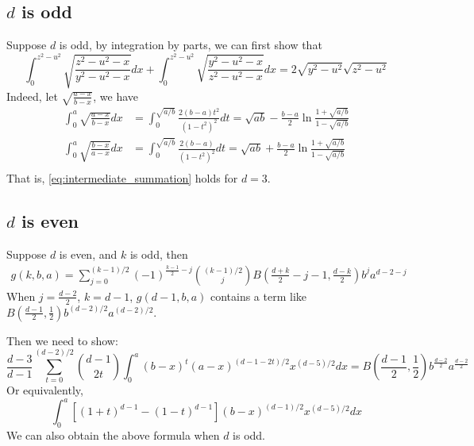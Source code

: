 \documentclass{article}
\begin{document}
\subsection{$d$ is odd}
Suppose $d$ is odd, by integration by parts, we can first show that
\begin{equation}
    \int_0^{z^2-u^2} \sqrt{\frac{z^2-u^2-x}{y^2-u^2-x}}dx
    + \int_0^{z^2-u^2} \sqrt{\frac{y^2-u^2-x}{z^2-u^2-x}}dx
    = 2\sqrt{y^2-u^2}\sqrt{z^2-u^2}
\end{equation}
Indeed, let $\sqrt{\frac{a-x}{b-x}}$, we have
\begin{align}
    \int_0^a \sqrt{\frac{a-x}{b-x}}dx
    &= \int_0^{\sqrt{a/b}} \frac{2(b-a)t^2}{(1-t^2)^2}dt
    =\sqrt{ab} - \frac{b-a}{2}\ln \frac{1+\sqrt{a/b}}{1-\sqrt{a/b}} \\
    \int_0^a \sqrt{\frac{b-x}{a-x}}dx
    &= \int_0^{\sqrt{a/b}} \frac{2(b-a)}{(1-t^2)^2}dt
    =\sqrt{ab} + \frac{b-a}{2}\ln \frac{1+\sqrt{a/b}}{1-\sqrt{a/b}} \\
\end{align}
That is, \eqref{eq:intermediate_summation} holds for $d=3$.

\subsection{$d$ is even}
Suppose $d$ is even, and $k$ is odd, then
\begin{align*}
    g(k,b,a)= \sum_{j=0}^{(k-1)/2}
    (-1)^{\frac{k-1}{2}-j}\binom{(k-1)/2}{j}
    B(\frac{d+k}{2}-j-1, \frac{d-k}{2})
    b^j a^{d-2-j}
\end{align*}
When $j=\frac{d-2}{2}$, $k=d-1$,
$g(d-1,b,a)$
contains a term like
$B(\frac{d-1}{2}, \frac{1}{2})b^{(d-2)/2}
a^{(d-2)/2}$.

Then we need to show:
\begin{equation*}
 \frac{d-3}{d-1} \sum_{t=0}^{(d-2)/2}
\binom{d-1}{2t} \int_0^a
(b-x)^{t}(a-x)^{(d-1-2t)/2}
x^{(d-5)/2} dx
=B(\frac{d-1}{2}, \frac{1}{2})
b^{\frac{d-2}{2}}
a^{\frac{d-2}{2}}
\end{equation*}
Or equivalently,
\begin{equation*}
    \int_0^a[(1+t)^{d-1}-(1-t)^{d-1}] (b-x)^{(d-1)/2}x^{(d-5)/2} dx
\end{equation*}
We can also obtain the above formula when $d$ is odd.
\end{document}
